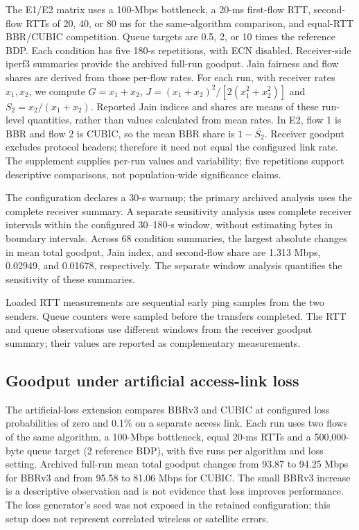 The E1/E2 matrix uses a 100-Mbps bottleneck, a 20-ms first-flow RTT,
second-flow RTTs of 20, 40, or 80 ms for the same-algorithm comparison,
and equal-RTT BBR/CUBIC competition. Queue targets are 0.5, 2, or 10
times the reference BDP. Each condition has five 180-s repetitions,
with ECN disabled. Receiver-side iperf3 summaries provide the archived
full-run goodput. Jain fairness and flow shares are derived from those
per-flow rates. For each run, with receiver rates $x_1,x_2$, we compute
$G=x_1+x_2$, $J=(x_1+x_2)^2/[2(x_1^2+x_2^2)]$ and
$S_2=x_2/(x_1+x_2)$. Reported Jain indices and shares are means of
these run-level quantities, rather than values calculated from mean rates.
In E2, flow 1 is BBR and flow 2 is CUBIC, so the mean BBR share is
$1-\overline{S_2}$. Receiver goodput excludes protocol headers; therefore
it need not equal the configured link rate. The supplement supplies
per-run values and variability; five repetitions support descriptive
comparisons, not population-wide significance claims.

The configuration declares a 30-s warmup; the primary archived analysis
uses the complete receiver summary. A separate sensitivity analysis uses
complete receiver intervals within the configured 30--180-s window,
without estimating bytes in boundary intervals. Across 68 condition
summaries, the largest absolute changes in mean total goodput, Jain
index, and second-flow share are 1.313 Mbps, 0.02949, and 0.01678,
respectively. The separate window analysis quantifies the sensitivity of these summaries.

Loaded RTT measurements are sequential early ping samples from the two
senders. Queue counters were sampled before the transfers completed.
The RTT and queue observations use different windows from the receiver
goodput summary; their values are reported as complementary measurements.




\subsection{Goodput under artificial access-link loss}
The artificial-loss extension compares BBRv3 and CUBIC at configured
loss probabilities of zero and 0.1\% on a separate access link. Each run
uses two flows of the same algorithm, a 100-Mbps bottleneck, equal 20-ms
RTTs and a 500,000-byte queue target (2 reference BDP),
with five runs per algorithm and loss setting. Archived full-run mean total
goodput changes from 93.87 to 94.25 Mbps for BBRv3 and from 95.58 to
81.06 Mbps for CUBIC. The small BBRv3 increase is a descriptive observation
and is not evidence that loss improves performance. The loss generator's
seed was not exposed in the retained configuration; this setup does not
represent correlated wireless or satellite errors.

